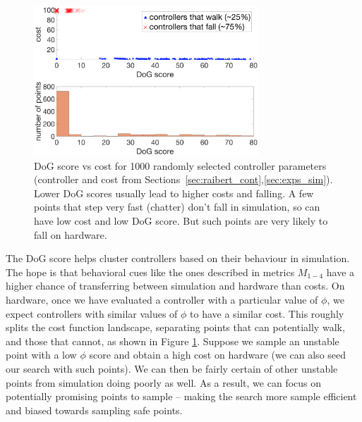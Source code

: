 \begin{figure}
    \centering
    \includegraphics[width=0.75\textwidth]{img/dog_vs_cost_and_hist.png}
    \caption{\small{DoG score vs cost for 1000 randomly selected controller parameters (controller and cost from Sections~\ref{sec:raibert_cont},\ref{sec:exps_sim}). Lower DoG scores usually lead to higher costs and falling. A few points that step very fast (chatter)  don't fall in simulation, so can have low cost and low DoG score. But such points are very likely to fall on hardware.}}
            \vspace{-5mm}
    \label{fig:dogvsfit}
\end{figure}

The DoG score helps cluster controllers based on their behaviour in simulation. The hope is that behavioral cues like the ones described in metrics $M_{1-4}$ have a higher chance of transferring between simulation and hardware  than costs. On hardware, once we have evaluated a controller with a particular value of $\phi$, we expect controllers with similar values of $\phi$ to have a similar cost. This roughly splits the cost function landscape, separating points that can potentially walk, and those that cannot, as shown in Figure \ref{fig:dogvsfit}. Suppose we sample an unstable point with a low $\phi$ score and obtain a high cost on hardware (we can also seed our search with such points). We can then be fairly certain of other unstable points from simulation doing poorly as well. As a result, we can focus on potentially promising points to sample -- making the search more sample efficient and biased towards sampling safe points.


